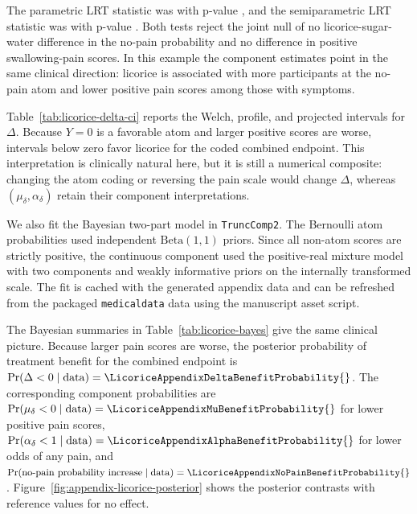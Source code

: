 \documentclass[11pt]{article}
\begin{document}


The parametric LRT statistic was \LicoriceAppendixLRTStatistic{} with p-value \LicoriceAppendixLRTP{}, and the semiparametric LRT statistic was \LicoriceAppendixSPLRTStatistic{} with p-value \LicoriceAppendixSPLRTP{}. Both tests reject the joint null of no licorice-sugar-water difference in the no-pain probability and no difference in positive swallowing-pain scores. In this example the component estimates point in the same clinical direction: licorice is associated with more participants at the no-pain atom and lower positive pain scores among those with symptoms.



Table~\ref{tab:licorice-delta-ci} reports the Welch, profile, and projected intervals for $\Delta$. Because $Y=0$ is a favorable atom and larger positive scores are worse, intervals below zero favor licorice for the coded combined endpoint. This interpretation is clinically natural here, but it is still a numerical composite: changing the atom coding or reversing the pain scale would change $\Delta$, whereas $(\mu_\delta,\alpha_\delta)$ retain their component interpretations.

We also fit the Bayesian two-part model in \texttt{TruncComp2}. The Bernoulli atom probabilities used independent $\mathrm{Beta}(1,1)$ priors. Since all non-atom scores are strictly positive, the continuous component used the positive-real mixture model with two components and weakly informative priors on the internally transformed scale. The fit is cached with the generated appendix data and can be refreshed from the packaged \texttt{medicaldata} data using the manuscript asset script.



The Bayesian summaries in Table~\ref{tab:licorice-bayes} give the same clinical picture. Because larger pain scores are worse, the posterior probability of treatment benefit for the combined endpoint is $\Pr(\Delta<0\mid\mathrm{data})=\LicoriceAppendixDeltaBenefitProbability{}$. The corresponding component probabilities are $\Pr(\mu_\delta<0\mid\mathrm{data})=\LicoriceAppendixMuBenefitProbability{}$ for lower positive pain scores, $\Pr(\alpha_\delta<1\mid\mathrm{data})=\LicoriceAppendixAlphaBenefitProbability{}$ for lower odds of any pain, and $\Pr(\text{no-pain probability increase}\mid\mathrm{data})=\LicoriceAppendixNoPainBenefitProbability{}$. Figure~\ref{fig:appendix-licorice-posterior} shows the posterior contrasts with reference values for no effect.
\end{document}

